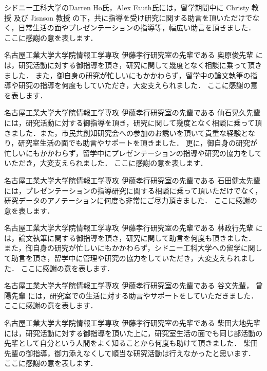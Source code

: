 シドニー工科大学のDarren Ho氏，Alex Fauth氏には，留学期間中に Christy 教授 及び Jisnson 教授 の下，共に指導を受け研究に関する助言を頂いただけでなく，日常生活の面やプレゼンテーションの指導等，幅広い助言を頂きました．
ここに感謝の意を表します． \par
\vspace{0.5cm}

名古屋工業大学大学院情報工学専攻 伊藤孝行研究室の先輩である 奥原俊先輩 には，研究活動に対する御指導を頂き，研究に関して幾度となく相談に乗って頂きました．
また，御自身の研究が忙しいにもかかわらず，留学中の論文執筆の指導や研究の指導を何度もしていただき，大変支えられました．
ここに感謝の意を表します． \par
\vspace{0.5cm}

名古屋工業大学大学院情報工学専攻 伊藤孝行研究室の先輩である 仙石晃久先輩 には，研究活動に対する御指導を頂き，研究に関して幾度となく相談に乗って頂きました．また，市民共創知研究会への参加のお誘いを頂いて貴重な経験となり，研究室生活の面でも助言やサポートを頂きました．
更に，御自身の研究が忙しいにもかかわらず，留学中にプレゼンテーションの指導や研究の協力をしていただき，大変支えられました．
ここに感謝の意を表します． \par
\vspace{0.5cm}

名古屋工業大学大学院情報工学専攻 伊藤孝行研究室の先輩である 石田健太先輩 には，プレゼンテーションの指導研究に関する相談に乗って頂いただけでなく，研究データのアノテーションに何度も非常にご尽力頂きました．
ここに感謝の意を表します． \par
\vspace{0.5cm}

名古屋工業大学大学院情報工学専攻 伊藤孝行研究室の先輩である 林政行先輩 には，論文執筆に関する御指導を頂き，研究に関して助言を何度も頂きました．
また，御自身の研究が忙しいにもかかわらず，シドニー工科大学への留学に関して助言を頂き，留学中に管理や研究の協力をしていただき，大変支えられました．
ここに感謝の意を表します． \par
\vspace{0.5cm}

名古屋工業大学大学院情報工学専攻 伊藤孝行研究室の先輩である 谷文先輩， 曾陽先輩 には，研究室での生活に対する助言やサポートをしていただきました．
ここに感謝の意を表します． \par
\vspace{0.5cm}

名古屋工業大学大学院情報工学専攻 伊藤孝行研究室の先輩である 柴田大地先輩 には，研究活動に対する御指導を頂いた上に，研究室生活の面でも同じ部活動の先輩として自分という人間をよく知ることから何度も助けて頂きました．
柴田先輩の御指導，御力添えなくして順当な研究活動は行えなかったと思います．
ここに感謝の意を表します． \par
\vspace{0.5cm}

